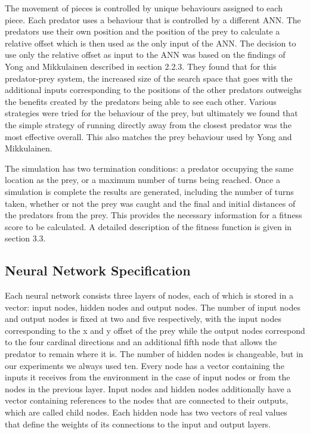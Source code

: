 \documentclass[12pt]{article} %
\begin{document}
The movement of pieces is controlled by unique behaviours assigned to each piece. Each predator uses a behaviour that is controlled by a different ANN. The predators use their own position and the position of the prey to calculate a relative offset which is then used as the only input of the ANN. The decision to use only the relative offset as input to the ANN was based on the findings of Yong and Mikkulainen \cite{Yong2001} described in section 2.2.3. They found that for this predator-prey system, the increased size of the search space that goes with the additional inputs corresponding to the positions of the other predators outweighs the benefits created by the predators being able to see each other. Various strategies were tried for the behaviour of the prey, but ultimately we found that the simple strategy of running directly away from the closest predator was the most effective overall. This also matches the prey behaviour used by Yong and Mikkulainen.

The simulation has two termination conditions: a predator occupying the same location as the prey, or a maximum number of turns being reached. Once a simulation is complete the results are generated, including the number of turns taken, whether or not the prey was caught and the final and initial distances of the predators from the prey. This provides the necessary information for a fitness score to be calculated. A detailed description of the fitness function is given in section 3.3.

\subsection{Neural Network Specification}

Each neural network consists three layers of nodes, each of which is stored in a vector: input nodes, hidden nodes and output nodes. The number of input nodes and output nodes is fixed at two and five respectively, with the input nodes corresponding to the x and y offset of the prey while the output nodes correspond to the four cardinal directions and an additional fifth node that allows the predator to remain where it is. The number of hidden nodes is changeable, but in our experiments we always used ten. Every node has a vector containing the inputs it receives from the environment in the case of input nodes or from the nodes in the previous layer. Input nodes and hidden nodes additionally have a vector containing references to the nodes that are connected to their outputs, which are called child nodes. Each hidden node has two vectors of real values that define the weights of its connections to the input and output layers.
\end{document}
